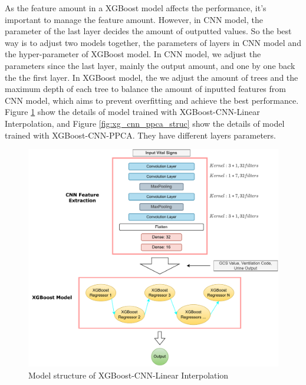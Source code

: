 \documentclass[12pt,a4paper,english
]{tunithesis}
\begin{document}
As the feature amount in a XGBoost model affects the performance, it's important to manage the feature amount. However, in CNN model, the parameter of the last layer decides the amount of outputted values. So the best way is to adjust two models together, the parameters of layers in CNN model and the hyper-parameter of XGBoost model. In CNN model, we adjust the parameters since the last layer, mainly the output amount, and one by one back the the first layer. In XGBoost model, the we adjust the amount of trees and the maximum depth of each tree to balance the amount of inputted features from CNN model, which aims to prevent overfitting and achieve the best performance. Figure \ref{fig:xg_cnn_li_struc} show the details of model trained with XGBoost-CNN-Linear Interpolation, and Figure \ref{fig:xg_cnn_ppca_struc} show the details of model trained with XGBoost-CNN-PPCA. They have different layers parameters.

\begin{figure}
  \begin{center}
    \includegraphics[width=1\textwidth]{thesis/img/xg_cnn_li.pdf}
  \end{center}
  \caption[XGBoost-CNN-LI model]{Model structure of XGBoost-CNN-Linear Interpolation}
  \label{fig:xg_cnn_li_struc}
\end{figure}
\end{document}
